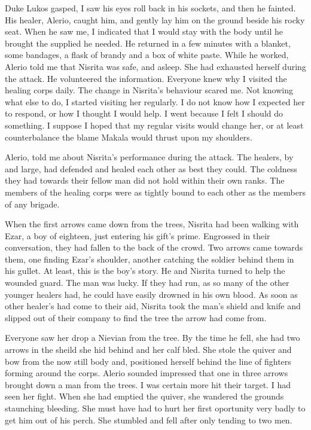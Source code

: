 \documentclass{article}
\begin{document}
Duke Lukos gasped, I saw his eyes roll back in his sockets, and then he fainted. His healer, Alerio, caught him, and gently lay him on the ground beside his rocky seat. When he saw me, I indicated that I would stay with the body until he brought the supplied he needed. He returned in a few minutes with a blanket, some bandages, a flask of brandy and a box of white paste. While he worked, Alerio told me that Nisrita was safe, and asleep. She had exhausted herself during the attack. He volunteered the information. Everyone knew why I visited the healing corps daily. The change in Nisrita's behaviour scared me. Not knowing what else to do, I started visiting her regularly. I do not know how I expected her to respond, or how I thought I would help. I went because I felt I should do something. I suppose I hoped that my regular visits would change her, or at least counterbalance the blame Makala would thrust upon my shoulders.

Alerio, told me about Nisrita's performance during the attack. The healers, by and large, had defended and healed each other as best they could. The coldness they had towards their fellow man did not hold within their own ranks. The members of the healing corps were as tightly bound to each other as the members of any brigade. 

When the first arrows came down from the trees, Nisrita had been walking with Ezar, a boy of eighteen, just entering his gift's prime. Engrossed in their conversation, they had fallen to the back of the crowd. Two arrows came towards them, one finding Ezar's shoulder, another catching the soldier behind them in his gullet. At least, this is the boy's story. He and Nisrita turned to help the wounded guard. The man was lucky. If they had run, as so many of the other younger healers had, he could have easily drowned in his own blood. As soon as other healer's had come to their aid, Nisrita took the man's shield and knife and slipped out of their company to find the tree the arrow had come from. 

Everyone saw her drop a Nievian from the tree. By the time he fell, she had two arrows in the sheild she hid behind and her calf bled. She stole the quiver and bow from the now still body and, positioned herself behind the line of fighters forming around the corps. Alerio sounded impressed that one in three arrows brought down a man from the trees. I was certain more hit their target. I had seen her fight. When she had emptied the quiver, she wandered the grounds staunching bleeding. She must have had to hurt her first oportunity very badly to get him out of his perch. She stumbled and fell after only tending to two men.
\end{document}
